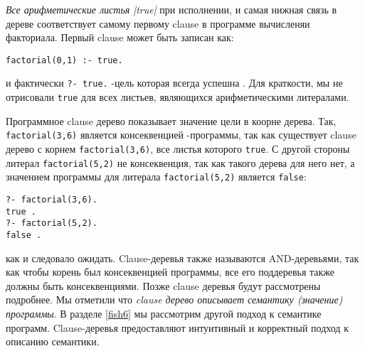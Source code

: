 \emph{Все арифметические листья \var|true|} при исполнении, и самая нижная связь в дереве соответствует
самому первому clause в программе вычисленяи факториала. Первый clause может
быть записан как:

\begin{verbatim}
factorial(0,1) :- true. 
\end{verbatim}
и фактически \verb|?- true.| \prolog-цель которая всегда успешна
. Для краткости, мы не отрисовали
\verb|true| для всех листьев, являющихся арифметическими литералами.

Программное clause дерево показывает значение цели в коорне дерева. Так,\\
\verb'factorial(3,6)' является консеквенцией \prolog-программы, так как
существует clause дерево с корнем \verb'factorial(3,6)', все листья которого
\verb|true|. С другой стороны литерал \verb'factorial(5,2)' не консеквенция,
так как такого дерева для него нет, а значением программы для литерала
\verb'factorial(5,2)' является \verb|false|:

\begin{verbatim}
?- factorial(3,6).  
true .
?- factorial(5,2).  
false . 
\end{verbatim}
как и следовало ожидать. Clause-деревья также называются AND-деревьями, так как
чтобы корень был консеквенцией программы, все его поддеревья также должны быть
консеквенциями. Позже clause деревья будут рассмотрены подробнее. Мы отметили
что \emph{clause дерево описывает семантику (значение) программы}. В разделе
\ref{fish6} мы рассмотрим другой подход к семантике программ. Clause-деревья
предоставляют интуитивный и корректный подход к описанию семантики.

\bigskip

